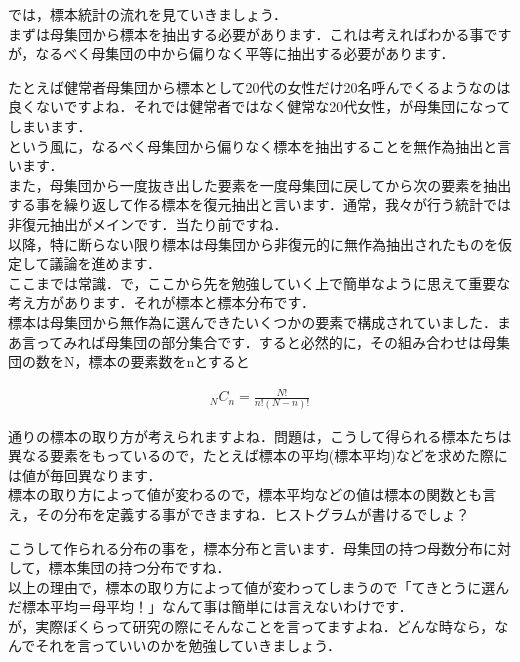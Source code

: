 \documentclass[11pt,a4paper,uplatex]{ujreport} 	%
\begin{document}
では，標本統計の流れを見ていきましょう．\\

まずは母集団から標本を抽出する必要があります．これは考えればわかる事ですが，なるべく母集団の中から偏りなく平等に抽出する必要があります．

たとえば健常者母集団から標本として20代の女性だけ20名呼んでくるようなのは良くないですよね．それでは健常者ではなく健常な20代女性，が母集団になってしまいます．\\

という風に，なるべく母集団から偏りなく標本を抽出することを無作為抽出と言います．\\

また，母集団から一度抜き出した要素を一度母集団に戻してから次の要素を抽出する事を繰り返して作る標本を復元抽出と言います．通常，我々が行う統計では非復元抽出がメインです．当たり前ですね．\\

以降，特に断らない限り標本は母集団から非復元的に無作為抽出されたものを仮定して議論を進めます．\\

ここまでは常識．で，ここから先を勉強していく上で簡単なように思えて重要な考え方があります．それが標本と標本分布です．\\

標本は母集団から無作為に選んできたいくつかの要素で構成されていました．まあ言ってみれば母集団の部分集合です．すると必然的に，その組み合わせは母集団の数をN，標本の要素数をnとすると

\begin{align}
  {}_N C_n = \frac{N!}{n!(N-n)!}
\end{align}

通りの標本の取り方が考えられますよね．問題は，こうして得られる標本たちは異なる要素をもっているので，たとえば標本の平均(標本平均)などを求めた際には値が毎回異なります．\\

標本の取り方によって値が変わるので，標本平均などの値は標本の関数とも言え，その分布を定義する事ができますね．ヒストグラムが書けるでしょ？

こうして作られる分布の事を，標本分布と言います．母集団の持つ母数分布に対して，標本集団の持つ分布ですね．\\

以上の理由で，標本の取り方によって値が変わってしまうので「てきとうに選んだ標本平均＝母平均！」なんて事は簡単には言えないわけです．\\

が，実際ぼくらって研究の際にそんなことを言ってますよね．どんな時なら，なんでそれを言っていいのかを勉強していきましょう．
\end{document}

